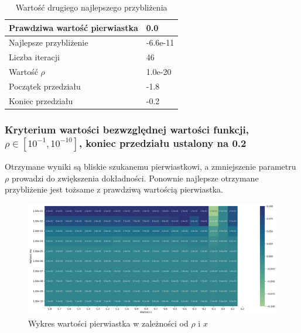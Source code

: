 \documentclass{article}
\begin{document}
\begin{table}[H]
    \centering
    \begin{tabular}{|l|l|}
    \hline
        Prawdziwa wartość pierwiastka & 0.0 \\ \hline
        Najlepsze przybliżenie & -6.6e-11 \\ \hline
        Liczba iteracji & 46 \\ \hline
        Wartość $\rho$ & 1.0e-20 \\ \hline
        Początek przedziału & -1.8 \\ \hline
        Koniec przedziału & -0.2 \\ \hline
    \end{tabular}
    \caption{Wartość drugiego najlepszego przybliżenia}
\end{table}

\subsubsection{Kryterium wartości bezwzględnej wartości funkcji, \(\rho \in [10^{-1}, 10^{-10}]\), koniec przedziału ustalony na 0.2}

Otrzymane wyniki są bliskie szukanemu pierwiastkowi, a zmniejszenie parametru \(\rho\) prowadzi do zwiększenia dokładności. Ponownie najlepsze otrzymane przybliżenie jest tożsame z prawdziwą wartością pierwiastka.

\begin{figure}[H]
  \centering
  \begin{minipage}[b]{0.9\textwidth}
    \includegraphics[width=\textwidth]{heatmap13.png}
  \end{minipage}
  \caption{Wykres wartości pierwiastka w zależności od \(\rho\) i \(x\)}
\end{figure}
\end{document}
